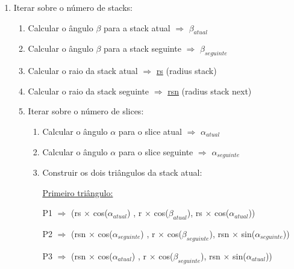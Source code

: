 \documentclass[a4paper]{article}
\begin{document}
\ttfamily
\begin{enumerate}
  \item Iterar sobre o número de stacks:
  \begin{enumerate}
    \item Calcular o ângulo $\beta$ para a stack atual $\Rightarrow$ \underline{$\beta_{atual}$}
    \item Calcular o ângulo $\beta$ para a stack seguinte $\Rightarrow$ \underline{$\beta_{seguinte}$}
    \item Calcular o raio da stack atual $\Rightarrow$ \underline{rs} (radius stack)
    \item Calcular o raio da stack seguinte $\Rightarrow$ \underline{rsn} (radius stack next)

    \item Iterar sobre o número de slices:
    \begin{enumerate}
      \item Calcular o ângulo $\alpha$ para o slice atual $\Rightarrow$ \underline{$\alpha_{atual}$}
      \item Calcular o ângulo $\alpha$ para o slice seguinte $\Rightarrow$ \underline{$\alpha_{seguinte}$}
      \item Construir os dois triângulos da stack atual:

      \vspace{0.5cm}

      \underline{Primeiro triângulo:}

      \vspace{0.5cm}

          \hspace{0.0cm} P1 $\Rightarrow$ (rs $\times$ cos($\alpha_{atual}$) , r $\times$ cos($\beta_{atual}$), rs $\times$ cos($\alpha_{atual}$))

      \vspace{0.2cm}

          \hspace{-0.5cm} P2 $\Rightarrow$ (rsn $\times$ cos($\alpha_{seguinte}$) , r $\times$ cos($\beta_{seguinte}$), rsn $\times$ sin($\alpha_{seguinte}$))

      \vspace{0.2cm}

          \hspace{0.0cm} P3 $\Rightarrow$ (rsn $\times$ cos($\alpha_{atual}$) , r $\times$ cos($\beta_{seguinte}$), rsn $\times$ sin($\alpha_{atual}$))

      \vspace{0.5cm}


\end{enumerate}
\end{enumerate}
\end{enumerate}
\end{document}
